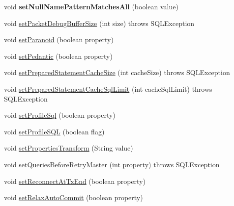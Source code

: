 \begin{DoxyCompactItemize}
\item 
\mbox{\label{classcom_1_1mysql_1_1jdbc_1_1_connection_properties_impl_a87806f8ccb35ce2ea3414cee90a1aa8c}} 
void {\bfseries set\+Null\+Name\+Pattern\+Matches\+All} (boolean value)
\item 
void \mbox{\hyperlink{classcom_1_1mysql_1_1jdbc_1_1_connection_properties_impl_adbb96f1f13b761373e6fb46ac8cde113}{set\+Packet\+Debug\+Buffer\+Size}} (int size)  throws S\+Q\+L\+Exception 
\item 
void \mbox{\hyperlink{classcom_1_1mysql_1_1jdbc_1_1_connection_properties_impl_af536d960a0f2d5e48f7b005ba212f8d7}{set\+Paranoid}} (boolean property)
\item 
void \mbox{\hyperlink{classcom_1_1mysql_1_1jdbc_1_1_connection_properties_impl_ad7ae4a320df7a8e5dc59507595393acf}{set\+Pedantic}} (boolean property)
\item 
void \mbox{\hyperlink{classcom_1_1mysql_1_1jdbc_1_1_connection_properties_impl_a170c65de1584d4588ea15ca73e1812bd}{set\+Prepared\+Statement\+Cache\+Size}} (int cache\+Size)  throws S\+Q\+L\+Exception 
\item 
void \mbox{\hyperlink{classcom_1_1mysql_1_1jdbc_1_1_connection_properties_impl_ab0d1a7e28fc1bcf16c1ee658e6a6ef7a}{set\+Prepared\+Statement\+Cache\+Sql\+Limit}} (int cache\+Sql\+Limit)  throws S\+Q\+L\+Exception 
\item 
void \mbox{\hyperlink{classcom_1_1mysql_1_1jdbc_1_1_connection_properties_impl_a0b1cfb3232b57decb11d935b913e1187}{set\+Profile\+Sql}} (boolean property)
\item 
void \mbox{\hyperlink{classcom_1_1mysql_1_1jdbc_1_1_connection_properties_impl_a117d473f1836b3b64201c0cf080afe05}{set\+Profile\+S\+QL}} (boolean flag)
\item 
void \mbox{\hyperlink{classcom_1_1mysql_1_1jdbc_1_1_connection_properties_impl_a93084da20cac3293dc418ae1c9c8cb74}{set\+Properties\+Transform}} (String value)
\item 
void \mbox{\hyperlink{classcom_1_1mysql_1_1jdbc_1_1_connection_properties_impl_a489f6cf07764fc854520a6287e19aadf}{set\+Queries\+Before\+Retry\+Master}} (int property)  throws S\+Q\+L\+Exception 
\item 
void \mbox{\hyperlink{classcom_1_1mysql_1_1jdbc_1_1_connection_properties_impl_a1f0ec176f93a55470c982b5b89699e03}{set\+Reconnect\+At\+Tx\+End}} (boolean property)
\item 
void \mbox{\hyperlink{classcom_1_1mysql_1_1jdbc_1_1_connection_properties_impl_a0b43ac232583f9bc628367fb8191f1e0}{set\+Relax\+Auto\+Commit}} (boolean property)

\end{DoxyCompactItemize}
